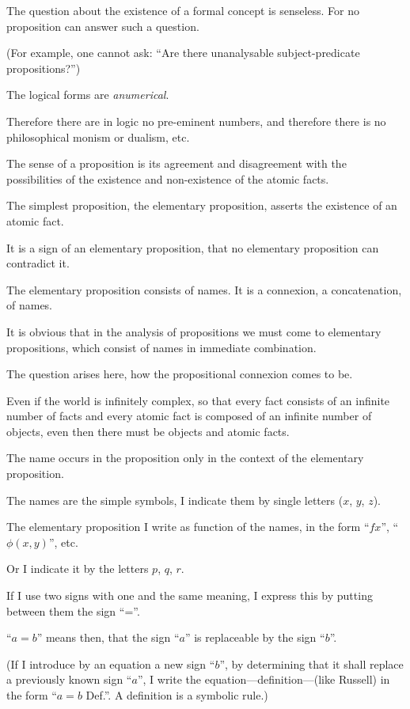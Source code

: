 {The question about the existence of a formal
concept is senseless. For no proposition can
answer such a question.

(For example, one cannot ask: ``Are there
unanalysable sub\-ject-pre\-di\-cate propositions?'')}


{The logical forms are \emph{anumerical}.

Therefore there are in logic no pre-eminent
numbers, and therefore there is no philosophical
monism or dualism, etc.}


{The sense of a proposition is its agreement
and disagreement with the possibilities of the
existence and non-existence of the atomic
facts.}


{The simplest proposition, the elementary proposition,
asserts the existence of an atomic fact.}


{It is a sign of an elementary proposition,
that no elementary proposition can contradict
it.}


{The elementary proposition consists of names.
It is a connexion, a concatenation, of names.}


{It is obvious that in the analysis of propositions
we must come to elementary propositions, which
consist of names in immediate combination.

The question arises here, how the propositional
connexion comes to be.}


{Even if the world is infinitely complex, so
that every fact consists of an infinite number
of  facts and every atomic fact is
composed of an infinite number of objects,
even then there must be objects and atomic
facts.}


{The name occurs in the proposition only in
the context of the elementary proposition.}


{The names are the simple symbols, I indicate
them by single letters ($x$, $y$, $z$).

The elementary proposition I write as function
of the names, in the form ``$fx$'', ``$\phi(x,y)$'', etc.

Or I indicate it by the letters $p$, $q$, $r$.}


{If I use two signs with one and the same
meaning, I express this by putting between them
the sign ``=''.

``$a = b$'' means then, that the sign ``$a$'' is
replaceable by the sign ``$b$''.

(If I introduce by an equation a new sign ``$b$'',
by determining that it shall replace a previously
known sign ``$a$'', I write the equation---definition---(like
Russell) in the form ``$a = b$ Def.''. A
definition is a symbolic rule.)}


